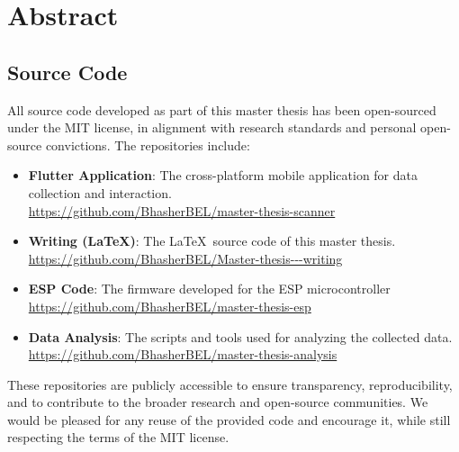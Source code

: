 \chapter*{Abstract}

\section*{Source Code}

All source code developed as part of this master thesis has been open-sourced under the MIT license, in alignment with research standards and personal open-source convictions. The repositories include:

\begin{itemize}
    \item \textbf{Flutter Application}: The cross-platform mobile application for data collection and interaction. \\
    \url{https://github.com/BhasherBEL/master-thesis-scanner}

    \item \textbf{Writing (LaTeX)}: The \LaTeX\ source code of this master thesis. \\
    \url{https://github.com/BhasherBEL/Master-thesis---writing}

    \item \textbf{ESP Code}: The firmware developed for the ESP microcontroller \\
    \url{https://github.com/BhasherBEL/master-thesis-esp}

    \item \textbf{Data Analysis}: The scripts and tools used for analyzing the collected data. \\
    \url{https://github.com/BhasherBEL/master-thesis-analysis}
\end{itemize}

These repositories are publicly accessible to ensure transparency, reproducibility, and to contribute to the broader research and open-source communities. We would be pleased for any reuse of the provided code and encourage it, while still respecting the terms of the MIT license.